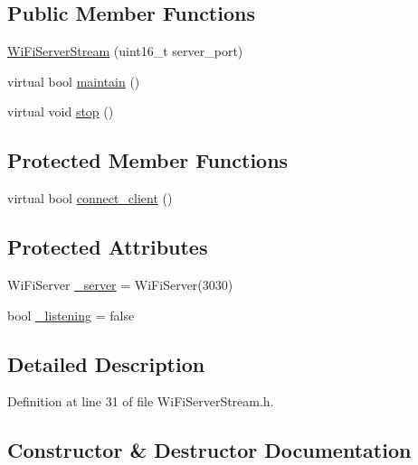 \subsection*{Public Member Functions}
\begin{DoxyCompactItemize}
\item 
\hyperlink{class_wi_fi_server_stream_a6fd1524853b4688fe4110651198ce58d}{Wi\+Fi\+Server\+Stream} (uint16\+\_\+t server\+\_\+port)
\item 
virtual bool \hyperlink{class_wi_fi_server_stream_ad6a4282ab87a5a5b15a5cd1ae2fb2a94}{maintain} ()
\item 
virtual void \hyperlink{class_wi_fi_server_stream_a5c70b0545e4150f64ddfe26aeb48a436}{stop} ()
\end{DoxyCompactItemize}
\subsection*{Protected Member Functions}
\begin{DoxyCompactItemize}
\item 
virtual bool \hyperlink{class_wi_fi_server_stream_a664a448394b896b93ff631e488840e81}{connect\+\_\+client} ()
\end{DoxyCompactItemize}
\subsection*{Protected Attributes}
\begin{DoxyCompactItemize}
\item 
Wi\+Fi\+Server \hyperlink{class_wi_fi_server_stream_a8071c6080d96ff5237bfd82ea4b7527b}{\+\_\+server} = Wi\+Fi\+Server(3030)
\item 
bool \hyperlink{class_wi_fi_server_stream_a932e0b7ba6cf5dbb293abe159a0e5637}{\+\_\+listening} = false
\end{DoxyCompactItemize}


\subsection{Detailed Description}


Definition at line 31 of file Wi\+Fi\+Server\+Stream.\+h.



\subsection{Constructor \& Destructor Documentation}
